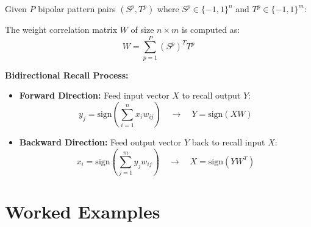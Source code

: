 \documentclass[12pt,a4paper]{article}
\begin{document}
\begin{tcolorbox}[formulabox, title={BAM Weight Matrix and Recall}]
Given $P$ bipolar pattern pairs $(S^p, T^p)$ where $S^p \in \{-1,1\}^n$ and $T^p \in \{-1,1\}^m$:
\par\noindent
The weight correlation matrix $W$ of size $n \times m$ is computed as:
\begin{equation}
  W = \sum_{p=1}^P (S^p)^T T^p
\end{equation}
\par\noindent
\textbf{Bidirectional Recall Process:}
\begin{itemize}[leftmargin=*, itemsep=3pt]
  \item \textbf{Forward Direction:} Feed input vector $X$ to recall output $Y$:
    \begin{equation}
      y_j = \text{sign}\left( \sum_{i=1}^n x_i w_{ij} \right) \quad \rightarrow \quad Y = \text{sign}(X W)
    \end{equation}
  \item \textbf{Backward Direction:} Feed output vector $Y$ back to recall input $X$:
    \begin{equation}
      x_i = \text{sign}\left( \sum_{j=1}^m y_j w_{ij} \right) \quad \rightarrow \quad X = \text{sign}(Y W^T)
    \end{equation}
\end{itemize}
\end{tcolorbox}

\section{Worked Examples}
\end{document}
